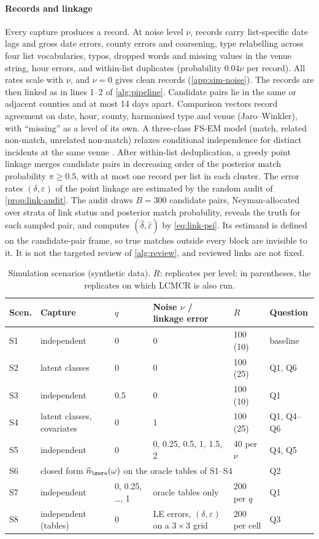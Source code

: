 \paragraph{Records and linkage} Every capture produces a record. At noise level $\nu$, records carry list-specific date lags and gross date errors, county errors and coarsening, type relabelling across four list vocabularies, typos, dropped words and missing values in the venue string, hour errors, and within-list duplicates (probability $0.04\nu$ per record). All rates scale with $\nu$, and $\nu=0$ gives clean records (\cref{app:sim-noise}). The records are then linked as in lines 1--2 of \cref{alg:pipeline}. Candidate pairs lie in the same or adjacent counties and at most 14 days apart. Comparison vectors record agreement on date, hour, county, harmonised type and venue (Jaro--Winkler), with ``missing'' as a level of its own. A three-class FS-EM model (match, related non-match, unrelated non-match) relaxes conditional independence for distinct incidents at the same venue \citep{larsen2001}. After within-list deduplication, a greedy point linkage merges candidate pairs in decreasing order of the posterior match probability $\pi\ge0.5$, with at most one record per list in each cluster. The error rates $(\delta,\varepsilon)$ of the point linkage are estimated by the random audit of \cref{prop:link-audit}. The audit draws $B=300$ candidate pairs, Neyman-allocated over strata of link status and posterior match probability, reveals the truth for each sampled pair, and computes $(\hat\delta,\hat\varepsilon)$ by \eqref{eq:link-psi}. Its estimand is defined on the candidate-pair frame, so true matches outside every block are invisible to it. It is not the targeted review of \cref{alg:review}, and reviewed links are not fixed.

\begin{table}[tp]
\centering
\caption{Simulation scenarios (synthetic data). $R$: replicates per level; in parentheses, the replicates on which LCMCR is also run.}\label{tab:sim-design}
\small
\setlength{\tabcolsep}{4pt}
\begin{tabular}{@{}llllll@{}}
\toprule
Scen. & Capture & $q$ & Noise $\nu$ / linkage error & $R$ & Question \\
\midrule
S1 & independent & 0 & 0 & 100 (10) & baseline \\
S2 & latent classes & 0 & 0 & 100 (25) & Q1, Q6 \\
S3 & independent & 0.5 & 0 & 100 (10) & Q1 \\
S4 & latent classes, covariates & 0 & 1 & 100 (25) & Q1, Q4--Q6 \\
S5 & independent & 0 & 0, 0.25, 0.5, 1, 1.5, 2 & 40 per $\nu$ & Q4, Q5 \\
S6 & \multicolumn{4}{l}{closed form $\widehat n_{\zero}(\omega)$ on the oracle tables of S1--S4} & Q2 \\
S7 & independent & 0, 0.25, \dots, 1 & oracle tables only & 200 per $q$ & Q1 \\
S8 & independent (tables) & 0 & LE errors, $(\delta,\varepsilon)$ on a $3\times3$ grid & 200 per cell & Q3 \\
\bottomrule
\end{tabular}
\end{table}

